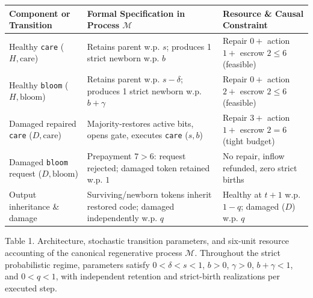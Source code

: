 \documentclass[11pt,a4paper]{article}
\newcounter{none}
\begin{document}
{\def\LTcaptype{none} %
\begin{longtable}[]{@{}
  >{\raggedright\arraybackslash}p{}
  >{\raggedright\arraybackslash}p{}
  >{\raggedright\arraybackslash}p{}@{}}
\toprule\noalign{}
\begin{minipage}[b]{\linewidth}\raggedright
Component or Transition
\end{minipage} & \begin{minipage}[b]{\linewidth}\raggedright
Formal Specification in Process \(\mathcal{M}\)
\end{minipage} & \begin{minipage}[b]{\linewidth}\raggedright
Resource \& Causal Constraint
\end{minipage} \\
\midrule\noalign{}
\endhead
\bottomrule\noalign{}
\endlastfoot
Healthy \texttt{care} (\(H, \mathrm{care}\)) & Retains parent w.p.
\(s\); produces 1 strict newborn w.p. \(b\) & Repair \(0 +\) action
\(1 +\) escrow \(2 \le 6\) (feasible) \\
Healthy \texttt{bloom} (\(H, \mathrm{bloom}\)) & Retains parent w.p.
\(s - \delta\); produces 1 strict newborn w.p. \(b + \gamma\) & Repair
\(0 +\) action \(2 +\) escrow \(2 \le 6\) (feasible) \\
Damaged repaired \texttt{care} (\(D, \mathrm{care}\)) &
Majority-restores active bits, opens gate, executes \texttt{care}
(\(s, b\)) & Repair \(3 +\) action \(1 +\) escrow \(2 = 6\) (tight
budget) \\
Damaged \texttt{bloom} request (\(D, \mathrm{bloom}\)) & Prepayment
\(7 > 6\): request rejected; damaged token retained w.p. \(1\) & No
repair, inflow refunded, zero strict births \\
Output inheritance \& damage & Surviving/newborn tokens inherit restored
code; damaged independently w.p. \(q\) & Healthy at \(t+1\) w.p.
\(1-q\); damaged (\(D\)) w.p. \(q\) \\
\end{longtable}
}

Table 1. Architecture, stochastic transition parameters, and six-unit
resource accounting of the canonical regenerative process
\(\mathcal{M}\). Throughout the strict probabilistic regime, parameters
satisfy \(0 < \delta < s < 1\), \(b > 0\), \(\gamma > 0\),
\(b + \gamma < 1\), and \(0 < q < 1\), with independent retention and
strict-birth realizations per executed step.
\end{document}
